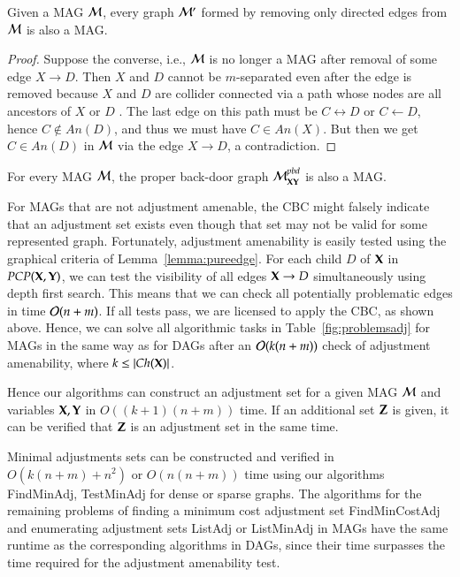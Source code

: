 \begin{lemma}
Given a MAG ${\cal M}$, every graph ${\cal M}'$ formed by removing
only directed edges from ${\cal M}$ is also a MAG.
\end{lemma}
\begin{proof}
Suppose the converse, i.e., ${\cal M}$ is no longer a 
MAG after removal of some edge $X \to D$. Then
$X$ and $D$ cannot be $m$-separated even 
after the edge is removed because $X$ and $D$
are collider connected via a path 
whose nodes are all ancestors 
of $X$ or $D$ \citep{Richardson2002}.
The last edge on this path must be 
 $C\leftrightarrow D$ or $C \gets D$, hence
 $C \notin \textit{An}(D)$, and thus 
we must have $C \in \textit{An}(X)$.
 But then we get $C \in \textit{An}(D)$ in 
 ${\cal M}$ via the edge $X \to D$, a contradiction.
\end{proof}
\begin{corollary}
For every MAG ${\cal M}$, the proper back-door graph
${\cal M}^{pbd}_{{\bf X}{\bf Y}}$ is also a MAG.
\end{corollary}

For MAGs that are not adjustment amenable, the CBC
might falsely indicate that an adjustment
set exists even though that set may not be valid for some
represented graph. Fortunately, adjustment amenability 
is easily tested using the graphical criteria
of Lemma~\ref{lemma:pureedge}.
For each child $D$ of ${\bf X}$ in
$\textit{PCP}({\bf X},{\bf Y})$, we can test the visibility of all edges ${\bf X} \to D$
simultaneously using depth first search. This means
that we can check all potentially problematic edges in 
time ${\cal O}(n+m)$. If all tests pass, we are licensed
to apply the CBC, as shown above.
Hence, we can solve all algorithmic tasks in Table~\ref{fig:problemsadj} 
for MAGs in the same way as for DAGs after an ${\cal O}(k(n+m))$
check of adjustment amenability, where $k\leq|\textit{Ch}({\bf X})|$.

 
Hence our algorithms can construct an adjustment set for a given MAG $ {\cal M} $ and variables $ {\bf X},{\bf Y} $ in $ O((k+1)(n+m)) $ time. If an additional set $ {\bf Z} $ is given, it can be verified that $ {\bf Z} $ is an adjustment set in the same  time.

Minimal adjustments sets can be constructed and verified in $ O(k(n+m) + n^2) $ or $ O(n(n+m)) $ time using our algorithms {\sc FindMinAdj}, {\sc TestMinAdj} for dense or sparse graphs. The algorithms for the remaining problems of finding a minimum cost adjustment set {\sc FindMinCostAdj} and enumerating adjustment sets {\sc ListAdj} or {\sc ListMinAdj} in MAGs have the same runtime as the corresponding algorithms in DAGs, since their time surpasses the time required for the adjustment amenability test.

